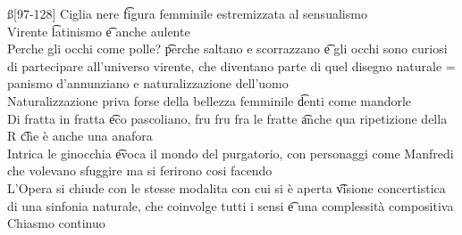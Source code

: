 \documentclass[12pt]{article}
\begin{document}
\ss[97-128]
Ciglia nere \t figura femminile estremizzata al sensualismo \\
Virente \t latinismo \t e anche aulente \\
Perche gli occhi come polle? \t perche saltano e scorrazzano \t e gli occhi sono curiosi di partecipare all'universo virente, che diventano parte di quel disegno naturale = panismo d'annunziano e naturalizzazione dell'uomo \\
Naturalizzazione priva forse della bellezza femminile \t denti come mandorle \\
Di fratta in fratta \t eco pascoliano, fru fru fra le fratte \t anche qua ripetizione della R \t che è anche una anafora \\
Intrica le ginocchia \t evoca il mondo del purgatorio, con personaggi come Manfredi che volevano sfuggire ma si ferirono cosi facendo \\
L'Opera si chiude con le stesse modalita con cui si è aperta \t visione concertistica di una sinfonia naturale, che coinvolge tutti i sensi \t e una complessità compositiva \\
Chiasmo continuo
\end{document}
